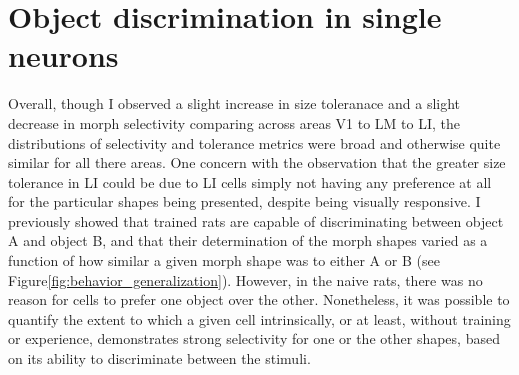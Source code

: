 \section{Object discrimination in single neurons}
% 
Overall, though I observed a slight increase in size toleranace and a slight decrease in morph selectivity comparing across areas V1 to LM to LI, the distributions of selectivity and tolerance metrics were broad and otherwise quite similar for all there areas. One concern with the observation that the greater size tolerance in LI could be due to LI cells simply not having any preference at all for the particular shapes being presented, despite being visually responsive.  
I previously showed that trained rats are capable of discriminating between object A and object B, and that their determination of the morph shapes varied as a function of how similar a given morph shape was to either A or B (see Figure\ref{fig:behavior_generalization}). However, in the naive rats, there was no reason for cells to prefer one object over the other. Nonetheless, it was possible to quantify the extent to which a given cell intrinsically, or at least, without training or experience, demonstrates strong selectivity for one or the other shapes, based on its ability to discriminate between the stimuli.

